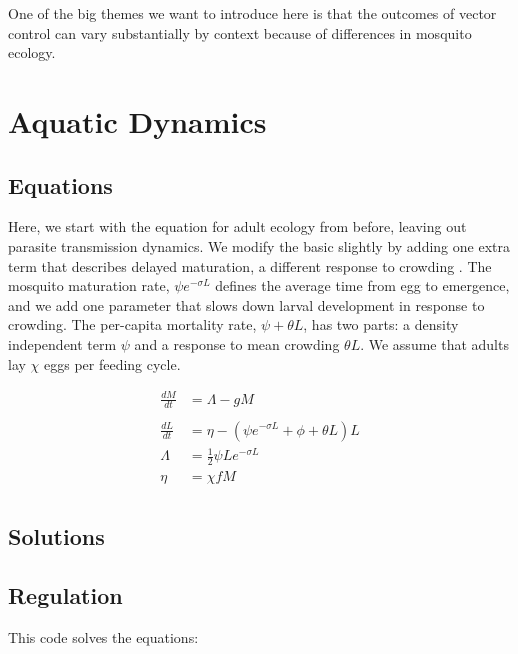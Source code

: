 \documentclass[
]{book}
\begin{document}
One of the big themes we want to introduce here is that the outcomes of vector control can vary substantially by context because of differences in mosquito ecology.

\section{Aquatic Dynamics}\label{aquatic-dynamics}

\subsection{Equations}\label{equations-1}

Here, we start with the equation for adult ecology from before, leaving out parasite transmission dynamics. We modify the basic slightly by adding one extra term that describes delayed maturation, a different response to crowding \autocite{SmithDL2013LarvalDynamics}. The mosquito maturation rate, \(\psi e^{-\sigma L}\) defines the average time from egg to emergence, and we add one parameter that slows down larval development in response to crowding. The per-capita mortality rate, \(\psi  + \theta L\), has two parts: a density independent term \(\psi\) and a response to mean crowding \(\theta L\). We assume that adults lay \(\chi\) eggs per feeding cycle.

\begin{equation}
\begin{array}{rl}
\frac{dM}{dt} &= \Lambda - g M\\  \\ \hline 
\frac{dL}{dt} &= \eta - (\psi e^{-\sigma L} + \phi + \theta L) L \\ 
\Lambda &= \frac{1}{2} \psi L e^{-\sigma L}\\ 
\eta &= \chi f M \\ 
\end{array}
\end{equation}

\subsection{Solutions}\label{solutions-3}

\subsection{Regulation}\label{regulation-1}

This code solves the equations:
\end{document}
